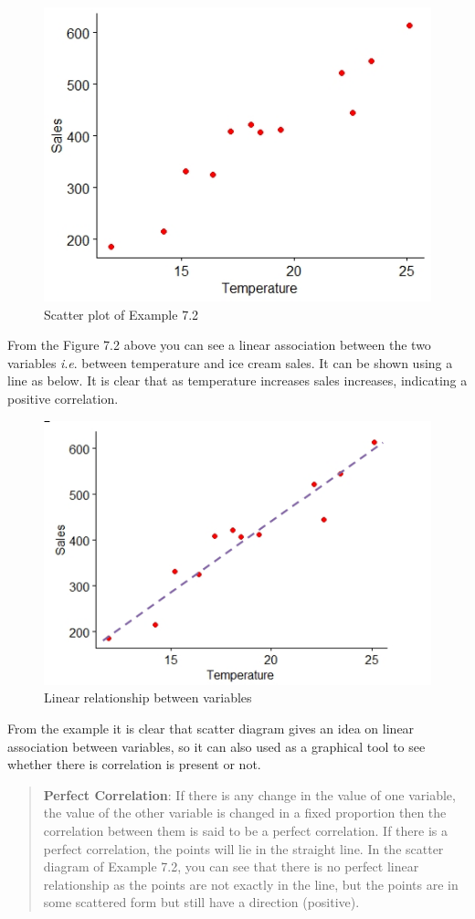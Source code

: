 \documentclass[
]{book}
\begin{document}
\begin{figure}

{\centering \includegraphics[width=0.5\linewidth]{images/image3c} 

}

\caption{Scatter plot of Example 7.2}\label{fig:c2}
\end{figure}

From the Figure 7.2 above you can see a linear association between the
two variables \emph{i}.\emph{e}. between temperature and ice cream sales. It can
be shown using a line as below. It is clear that as temperature
increases sales increases, indicating a positive correlation.

\begin{figure}

{\centering \includegraphics[width=0.5\linewidth]{images/image3.5c} 

}

\caption{Linear relationship between variables}\label{fig:c3}
\end{figure}

From the example it is clear that scatter diagram gives an idea on
linear association between variables, so it can also used as a graphical
tool to see whether there is correlation is present or not.

\begin{quote}
\textbf{Perfect Correlation}: If there is any change in the value of one
variable, the value of the other variable is changed in a fixed
proportion then the correlation between them is said to be a perfect
correlation. If there is a perfect correlation, the points will lie in
the straight line. In the scatter diagram of Example 7.2, you can see
that there is no perfect linear relationship as the points are not
exactly in the line, but the points are in some scattered form but
still have a direction (positive).
\end{quote}
\end{document}
